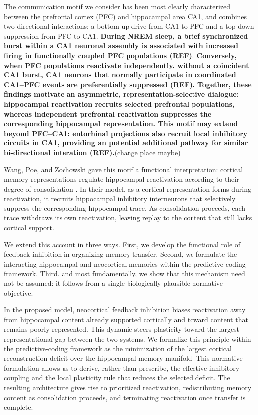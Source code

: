 \documentclass[10pt,letterpaper]{article}
\theoremstyle{plain}
\theoremstyle{remark}
\begin{document}
The communication motif we consider has been most clearly characterized between the prefrontal cortex (PFC) and hippocampal area CA1, and combines two directional interactions: a bottom-up drive from CA1 to PFC and a top-down suppression from PFC to CA1. \textbf{During NREM sleep, a brief synchronized burst within a CA1 neuronal assembly is associated with increased firing in functionally coupled PFC populations (REF). Conversely, when PFC populations reactivate independently, without a coincident CA1 burst, CA1 neurons that normally participate in coordinated CA1–PFC events are preferentially suppressed (REF). Together, these findings motivate an asymmetric, representation-selective dialogue: hippocampal reactivation recruits selected prefrontal populations, whereas independent prefrontal reactivation suppresses the corresponding hippocampal representation. This motif may extend beyond PFC–CA1: entorhinal projections also recruit local inhibitory circuits in CA1, providing an potential additional pathway for similar bi-directional interation (REF).}(change place maybe)

Wang, Poe, and Zochowski gave this motif a functional interpretation: cortical memory representations regulate hippocampal reactivation according to their degree of consolidation \cite{wang2008heterogeneities}. In their model, as a cortical representation forms during reactivation, it recruits hippocampal inhibitory interneurons that selectively suppress the corresponding hippocampal trace. As consolidation proceeds, each trace withdraws its own reactivation, leaving replay to the content that still lacks cortical support.

We extend this account in three ways. First, we develop the functional role of feedback inhibition in organizing memory transfer. Second, we formulate the interacting hippocampal and neocortical memories within the predictive-coding framework. Third, and most fundamentally, we show that this mechanism need not be assumed: it follows from a single biologically plausible normative objective.

In the proposed model, neocortical feedback inhibition biases reactivation away from hippocampal content already supported cortically and toward content that remains poorly represented. This dynamic steers plasticity toward the largest representational gap between the two systems. We formalize this principle within the predictive-coding framework as the minimization of the largest cortical reconstruction deficit over the hippocampal memory manifold. This normative formulation allows us to derive, rather than prescribe, the effective inhibitory coupling and the local plasticity rule that reduces the selected deficit. The resulting architecture gives rise to prioritized reactivation, redistributing memory content as consolidation proceeds, and terminating reactivation once transfer is complete.
\end{document}
